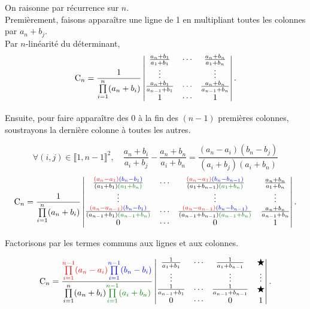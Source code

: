\begin{preuve}
    On raisonne par récurrence sur $n$. \\
    Premièrement, faisons apparaître une ligne de 1 en multipliant toutes les colonnes par $a_n+b_j$. \\
    Par $n$-linéarité du déterminant,
    $$\mathrm{C}_n = \frac{1}{\prod\limits_{i=1}^{n}(a_n + b_i)} \begin{vmatrix}
        \frac{a_n+b_1}{a_1+b_1} & \cdots & \frac{a_n+b_n}{a_1+b_n} \\
        \vdots & & \vdots \\
        \frac{a_n+b_1}{a_{n-1}+b_1} & \cdots & \frac{a_n+b_n}{a_{n-1}+b_n} \\
        1 & \cdots & 1
    \end{vmatrix}.$$
    
    Ensuite, pour faire apparaître des 0 à la fin des $(n-1)$ premières colonnes, soustrayons la dernière colonne à toutes les autres. 
    
    $$
        \forall (i,j) \in \llbracket 1, n-1 \rrbracket^2, \quad \frac{a_n+b_i}{a_i+b_j} - \frac{a_n+b_n}{a_i+b_n} = \frac{(a_n - a_i)(b_n-b_j)}{(a_i + b_j)(a_i + b_n)}
    $$
    $$\Cauchy_n = \frac{1}{\prod\limits_{i=1}^{n}(a_n + b_i)} \begin{vmatrix}
        \frac{\textcolor{red}{(a_n - a_1)}\textcolor{blue}{(b_n-b_1)}}{(a_1 + b_1) \textcolor{green}{(a_1 + b_n)}} & \cdots & \frac{\textcolor{red}{(a_n - a_1)}\textcolor{blue}{(b_n-b_{n-1})}}{(a_1 + b_{n-1})\textcolor{green}{(a_1 + b_n)}} & \frac{a_n+b_n}{a_1+b_n} \\
        \vdots & & \vdots & \vdots \\
        \frac{\textcolor{red}{(a_n - a_{n-1})}\textcolor{blue}{(b_n-b_1)}}{(a_{n-1} + b_1)\textcolor{green}{(a_{n-1} + b_n)}} & \cdots & \frac{\textcolor{red}{(a_n - a_{n-1})}\textcolor{blue}{(b_n-b_{n-1})}}{(a_{n-1} + b_{n-1})\textcolor{green}{(a_{n-1} + b_n)}} & \frac{a_n+b_n}{a_{n-1}+b_n} \\
        0 & \cdots & 0 & 1
    \end{vmatrix}.$$
        
    Factorisons par les termes communs aux lignes et aux colonnes.
        
    $$\Cauchy_n =  \frac{\textcolor{red}{\prod\limits_{i=1}^{n-1} (a_n - a_i)} \textcolor{blue}{\prod\limits_{i = 1}^{n-1}(b_n - b_i)}}{\prod\limits_{i=1}^{n}(a_n + b_i) \textcolor{green}{\prod\limits_{i = 1}^{n - 1} (a_i + b_n)}} \begin{vmatrix}
        \frac{1}{a_1+b_1} & \cdots & \frac{1}{a_1+b_{n-1}} & \bigstar \\
        \vdots & & \vdots & \vdots \\
        \frac{1}{a_{n-1}+b_1} & \cdots & \frac{1}{a_{n-1}+b_{n-1}} & \bigstar \\
        0 & \cdots & 0 & 1
    \end{vmatrix}.$$
        

\end{preuve}
